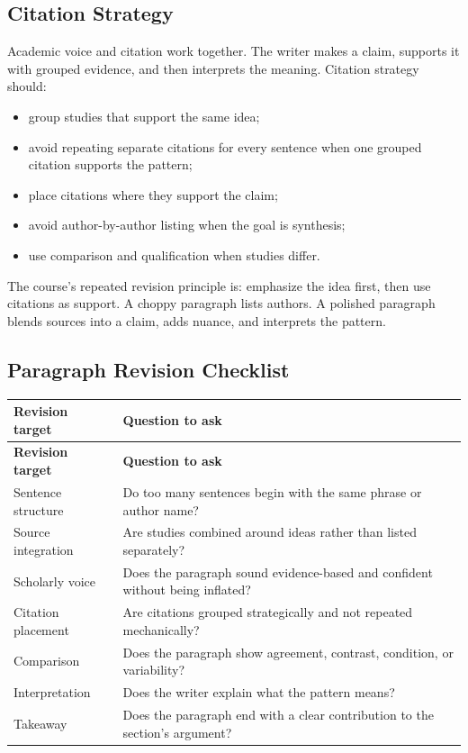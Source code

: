 \documentclass[10pt,letterpaper]{article}
\begin{document}
\subsection{Citation Strategy}

Academic voice and citation work together. The writer makes a claim, supports it with grouped evidence, and then interprets the meaning. Citation strategy should:

\begin{itemize}
\item group studies that support the same idea;
\item avoid repeating separate citations for every sentence when one grouped citation supports the pattern;
\item place citations where they support the claim;
\item avoid author-by-author listing when the goal is synthesis;
\item use comparison and qualification when studies differ.
\end{itemize}

The course's repeated revision principle is: emphasize the idea first, then use citations as support. A choppy paragraph lists authors. A polished paragraph blends sources into a claim, adds nuance, and interprets the pattern.

\subsection{Paragraph Revision Checklist}

\begin{longtable}{L{4.2cm} L{9.3cm}}
\toprule
{}
\textbf{Revision target} & \textbf{Question to ask}\\
\midrule
\endfirsthead
\toprule
{}
\textbf{Revision target} & \textbf{Question to ask}\\
\midrule
\endhead
\bottomrule
\endfoot
Sentence structure & Do too many sentences begin with the same phrase or author name?\\
Source integration & Are studies combined around ideas rather than listed separately?\\
Scholarly voice & Does the paragraph sound evidence-based and confident without being inflated?\\
Citation placement & Are citations grouped strategically and not repeated mechanically?\\
Comparison & Does the paragraph show agreement, contrast, condition, or variability?\\
Interpretation & Does the writer explain what the pattern means?\\
Takeaway & Does the paragraph end with a clear contribution to the section's argument?\\
\end{longtable}
\end{document}
